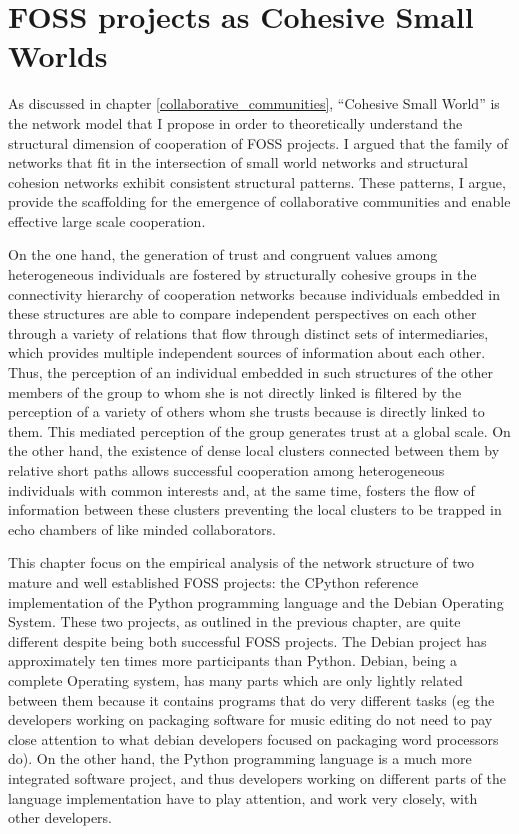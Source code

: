 \chapter{FOSS projects as Cohesive Small Worlds}
\label{cohesive_small_world}

As discussed in chapter \ref{collaborative_communities}, ``Cohesive Small World'' is the network model that I propose in order to theoretically understand the structural dimension of cooperation of FOSS projects. I argued that the family of networks that fit in the intersection of small world networks and structural cohesion networks exhibit consistent structural patterns. These patterns, I argue, provide the scaffolding for the emergence of collaborative communities and enable effective large scale cooperation.

On the one hand, the generation of trust and congruent values among heterogeneous individuals are fostered by structurally cohesive groups in the connectivity hierarchy of cooperation networks because individuals embedded in these structures are able to compare independent perspectives on each other through a variety of relations that flow through distinct sets of intermediaries, which provides multiple independent sources of information about each other. Thus, the perception of an individual embedded in such structures of the other members of the group to whom she is not directly linked is filtered by the perception of a variety of others whom she trusts because is directly linked to them. This mediated perception of the group generates trust at a global scale. On the other hand, the existence of dense local clusters connected between them by relative short paths allows successful cooperation among heterogeneous individuals with common interests and, at the same time, fosters the flow of information between these clusters preventing the local clusters to be trapped in echo chambers of like minded collaborators.

This chapter focus on the empirical analysis of the network structure of two mature and well established FOSS projects: the CPython reference implementation of the Python programming language and the Debian Operating System. These two projects, as outlined in the previous chapter, are quite different despite being both successful FOSS projects. The Debian project has approximately ten times more participants than Python. Debian, being a complete Operating system, has many parts which are only lightly related between them because it contains programs that do very different tasks (eg the developers working on packaging software for music editing do not need to pay close attention to what debian developers focused on packaging word processors do). On the other hand, the Python programming language is a much more integrated software project, and thus developers working on different parts of the language implementation have to play attention, and work very closely, with other developers.

